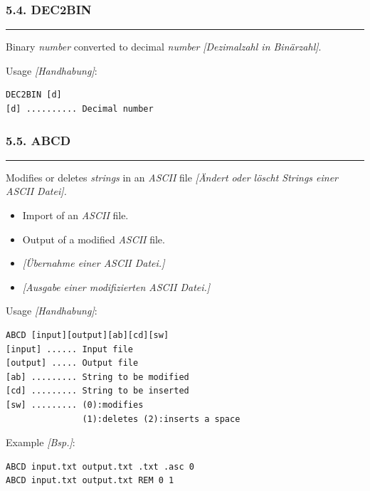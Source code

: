 \documentclass[
]{article}
\begin{document}
\hypertarget{dec2bin}{%
\subsubsection{5.4. DEC2BIN}\label{dec2bin}}

\begin{center}\rule{0.5\linewidth}{0.5pt}\end{center}

Binary \emph{number} converted to decimal \emph{number}
\emph{{[}Dezimalzahl in Binärzahl{]}}.

Usage \emph{{[}Handhabung{]}}:

\begin{verbatim}
DEC2BIN [d]
[d] .......... Decimal number
\end{verbatim}

\hypertarget{abcd}{%
\subsubsection{5.5. ABCD}\label{abcd}}

\begin{center}\rule{0.5\linewidth}{0.5pt}\end{center}

Modifies or deletes \emph{strings} in an \emph{ASCII} file
\emph{{[}Ändert oder löscht Strings einer ASCII Datei{]}.}

\begin{itemize}
\item
  Import of an \emph{ASCII} file.
\item
  Output of a modified \emph{ASCII} file.
\item
  \emph{{[}Übernahme einer ASCII Datei.{]}}
\item
  \emph{{[}Ausgabe einer modifizierten ASCII Datei.{]}}
\end{itemize}

Usage \emph{{[}Handhabung{]}}:

\begin{verbatim}
ABCD [input][output][ab][cd][sw]
[input] ...... Input file
[output] ..... Output file 
[ab] ......... String to be modified
[cd] ......... String to be inserted
[sw] ......... (0):modifies 
               (1):deletes (2):inserts a space
\end{verbatim}

Example \emph{{[}Bsp.{]}}:

\begin{verbatim}
ABCD input.txt output.txt .txt .asc 0
ABCD input.txt output.txt REM 0 1
\end{verbatim}
\end{document}
